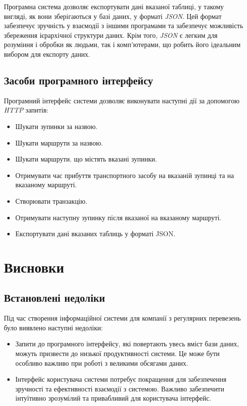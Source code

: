 \documentclass[oneside,14pt]{extarticle}
\begin{document}
Програмна система дозволяє експортувати дані вказаної таблиці, у такому вигляді, як вони зберігаються у базі даних, у форматі \textit{JSON}. Цей формат забезпечує зручність у взаємодії з іншими програмами та забезпечує можливість збереження ієрархічної структури даних. Крім того, \textit{JSON} є легким для розуміння і обробки як людьми, так і комп'ютерами, що робить його ідеальним вибором для експорту даних.

\subsection{Засоби програмного інтерфейсу}
Програмний інтерфейс системи дозволяє виконувати наступні дії за допомогою \textit{HTTP} запитів:
\begin{itemize}
\item Шукати зупинки за назвою.
\item Шукати маршрути за назвою.
\item Шукати маршрути. що містять вказані зупинки.
\item Отримувати час прибуття транспортного засобу на вказаній зупинці та на вказаному маршруті.
\item Створювати транзакцію.
\item Отримувати наступну зупинку після вказаної на вказаному маршруті.
\item Експортувати дані вказаних таблиць у форматі JSON.

\end{itemize}

\newpage

\section*{Висновки}
\setcounter{subsection}{0}
\subsection{Встановлені недоліки}
Під час створення інформаційної системи для компанії з регулярних перевезень було виявлено наступні недоліки:
\begin{itemize}
\item Запити до програмного інтерфейсу, які повертають увесь вміст бази даних, можуть призвести до низької продуктивності системи. Це може бути особливо важливо при роботі з великими обсягами даних.
\item Інтерфейс користувача системи потребує покращення для забезпечення зручності та ефективності взаємодії з системою. Важливо забезпечити інтуїтивно зрозумілий та привабливий для користувача інтерфейс.
\end{itemize}
\end{document}
